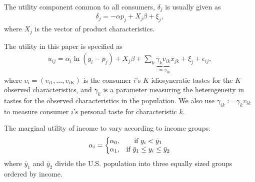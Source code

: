 \documentclass[11pt]{elegantbook}
\begin{document}
The utility component common to all consumers, $\delta_j$ is usually given as
\begin{equation}
    \begin{aligned}
        \delta_j=-\alpha p_j + X_j\beta + \xi_j,
    \end{aligned}
    \nonumber
\end{equation}
where $X_j$ is the vector of product characteristics.


The utility in this paper is specified as
\begin{equation}
    \begin{aligned}
        u_{ij}=\alpha_i\ln(y_i-p_j)+X_j\beta+\sum_{k}\underbrace{\gamma_k v_{ik}}_{:=\gamma_{ik}} x_{jk} + \xi_j + \epsilon_{ij},
    \end{aligned}
    \nonumber
\end{equation}
where $v_i=(v_{i1},...,v_{iK})$ is the consumer $i$'s $K$ idiosyncratic tastes for the $K$ observed characteristics, and $\gamma_k$ is a parameter measuring the heterogeneity in tastes for the observed characteristics in the population. We also use $\gamma_{ik}:=\gamma_{k}v_{ik}$ to measure consumer $i$'s personal taste for characteristic $k$.

The marginal utility of income to vary according to income groups:
\begin{equation}
    \begin{aligned}
        \alpha_i=\left\{\begin{matrix}
            \alpha_0,& \textnormal{if }y_i<\bar{y}_1\\
            \alpha_1,& \textnormal{if }\bar{y}_1\leq y_i\leq\bar{y}_2
        \end{matrix}\right.
    \end{aligned}
    \nonumber
\end{equation}
where $\bar{y}_1$ and $\bar{y}_2$ divide the U.S. population into three equally sized groups ordered by income.










\end{document}
